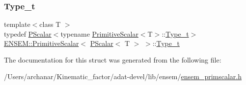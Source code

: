\subsubsection{\texorpdfstring{Type\_t}{Type\_t}\hspace{0.1cm}{\footnotesize\ttfamily [3/3]}}
{\footnotesize\ttfamily template$<$class T $>$ \\
typedef \mbox{\hyperlink{classENSEM_1_1PScalar}{P\+Scalar}}$<$typename \mbox{\hyperlink{structENSEM_1_1PrimitiveScalar}{Primitive\+Scalar}}$<$T$>$\+::\mbox{\hyperlink{structENSEM_1_1PrimitiveScalar_3_01PScalar_3_01T_01_4_01_4_a3b7d612e567079b69a727ff98d74563e}{Type\+\_\+t}}$>$ \mbox{\hyperlink{structENSEM_1_1PrimitiveScalar}{E\+N\+S\+E\+M\+::\+Primitive\+Scalar}}$<$ \mbox{\hyperlink{classENSEM_1_1PScalar}{P\+Scalar}}$<$ T $>$ $>$\+::\mbox{\hyperlink{structENSEM_1_1PrimitiveScalar_3_01PScalar_3_01T_01_4_01_4_a3b7d612e567079b69a727ff98d74563e}{Type\+\_\+t}}}



The documentation for this struct was generated from the following file\+:\begin{DoxyCompactItemize}
\item 
/\+Users/archanar/\+Kinematic\+\_\+factor/adat-\/devel/lib/ensem/\mbox{\hyperlink{adat-devel_2lib_2ensem_2ensem__primscalar_8h}{ensem\+\_\+primscalar.\+h}}\end{DoxyCompactItemize}
